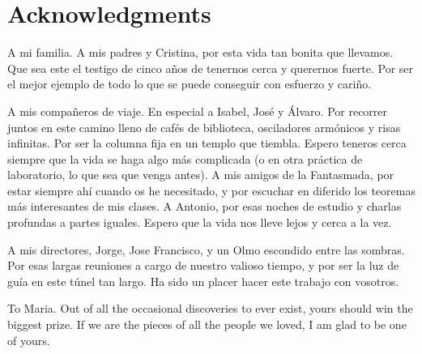 
\pagestyle{fancy} 

\chapter*{Acknowledgments}

A mi familia. A mis padres y Cristina, por esta vida tan bonita que llevamos. Que sea este el testigo de cinco años de tenernos cerca y querernos fuerte. Por ser el mejor ejemplo de todo lo que se puede conseguir con esfuerzo y cariño.

\vspace{10pt}

\noindent A mis compañeros de viaje. En especial a Isabel, José y Álvaro. Por recorrer juntos en este camino lleno de cafés de biblioteca, osciladores armónicos y risas infinitas. Por ser la columna fija en un templo que tiembla. Espero teneros cerca siempre que la vida se haga algo más complicada (o en otra práctica de laboratorio, lo que sea que venga antes). A mis amigos de la Fantasmada, por estar siempre ahí cuando os he necesitado, y por escuchar en diferido los teoremas más interesantes de mis clases. A Antonio, por esas noches de estudio y charlas profundas a partes iguales. Espero que la vida nos lleve lejos y cerca a la vez.

\vspace{10pt}

\noindent A mis directores, Jorge, Jose Francisco, y un Olmo escondido entre las sombras. Por esas largas reuniones a cargo de nuestro valioso tiempo, y por ser la luz de guía en este túnel tan largo. Ha sido un placer hacer este trabajo con vosotros. 

\vspace{10pt}

\noindent To Maria. Out of all the occasional discoveries to ever exist, yours should win the biggest prize. If we are the pieces of all the people we loved, I am glad to be one of yours.